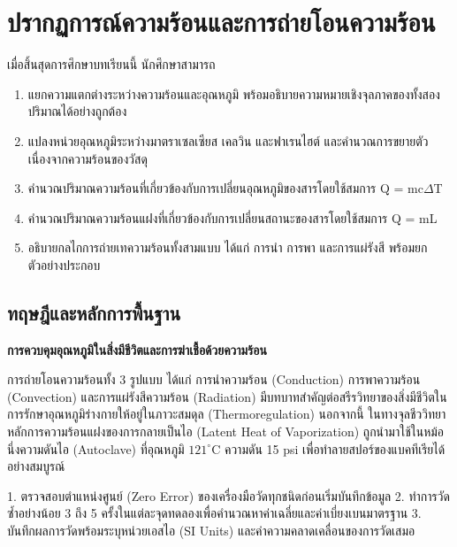 \chapter{ปรากฏการณ์ความร้อนและการถ่ายโอนความร้อน}
\label{ch:ch09_heat_transfer}

\begin{conceptbox}[title=วัตถุประสงค์การเรียนรู้ประจำบท]
เมื่อสิ้นสุดการศึกษาบทเรียนนี้ นักศึกษาสามารถ
\begin{enumerate}
    \item แยกความแตกต่างระหว่างความร้อนและอุณหภูมิ พร้อมอธิบายความหมายเชิงจุลภาคของทั้งสองปริมาณได้อย่างถูกต้อง
    \item แปลงหน่วยอุณหภูมิระหว่างมาตราเซลเซียส เคลวิน และฟาเรนไฮต์ และคำนวณการขยายตัวเนื่องจากความร้อนของวัสดุ
    \item คำนวณปริมาณความร้อนที่เกี่ยวข้องกับการเปลี่ยนอุณหภูมิของสารโดยใช้สมการ Q = mc$\Delta$T
    \item คำนวณปริมาณความร้อนแฝงที่เกี่ยวข้องกับการเปลี่ยนสถานะของสารโดยใช้สมการ Q = mL
    \item อธิบายกลไกการถ่ายเทความร้อนทั้งสามแบบ ได้แก่ การนำ การพา และการแผ่รังสี พร้อมยกตัวอย่างประกอบ
\end{enumerate}
\end{conceptbox}

\section{ทฤษฎีและหลักการพื้นฐาน}

\begin{bioappbox}
\textbf{การควบคุมอุณหภูมิในสิ่งมีชีวิตและการฆ่าเชื้อด้วยความร้อน}

การถ่ายโอนความร้อนทั้ง 3 รูปแบบ ได้แก่ การนำความร้อน (Conduction) การพาความร้อน (Convection) และการแผ่รังสีความร้อน (Radiation) มีบทบาทสำคัญต่อสรีรวิทยาของสิ่งมีชีวิตในการรักษาอุณหภูมิร่างกายให้อยู่ในภาวะสมดุล (Thermoregulation) นอกจากนี้ ในทางจุลชีววิทยา หลักการความร้อนแฝงของการกลายเป็นไอ (Latent Heat of Vaporization) ถูกนำมาใช้ในหม้อนึ่งความดันไอ (Autoclave) ที่อุณหภูมิ $121^\circ\text{C}$ ความดัน 15 psi เพื่อทำลายสปอร์ของแบคทีเรียได้อย่างสมบูรณ์
\end{bioappbox}

\begin{labbox}
1. ตรวจสอบตำแหน่งศูนย์ (Zero Error) ของเครื่องมือวัดทุกชนิดก่อนเริ่มบันทึกข้อมูล
2. ทำการวัดซ้ำอย่างน้อย 3 ถึง 5 ครั้งในแต่ละจุดทดลองเพื่อคำนวณหาค่าเฉลี่ยและค่าเบี่ยงเบนมาตรฐาน
3. บันทึกผลการวัดพร้อมระบุหน่วยเอสไอ (SI Units) และค่าความคลาดเคลื่อนของการวัดเสมอ
\end{labbox}

